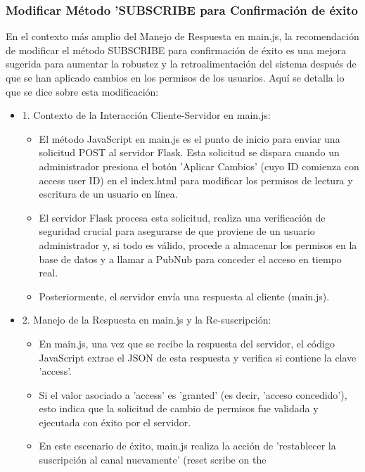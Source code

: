 \documentclass{report}
\begin{document}
\subsubsection{Modificar Método 'SUBSCRIBE para Confirmación de éxito}
En el contexto más amplio del Manejo de Respuesta en main.js, la recomendación de modificar el método SUBSCRIBE para confirmación de éxito es 
una mejora sugerida para aumentar la robustez y la retroalimentación del sistema después de que se han aplicado cambios en los permisos de los usuarios.
Aquí se detalla lo que se dice sobre esta modificación:
\begin{itemize}
    \item 1. Contexto de la Interacción Cliente-Servidor en main.js:
        \begin{itemize}
            \item El método JavaScript en main.js es el punto de inicio para enviar una solicitud POST al servidor Flask. Esta solicitud se 
            dispara cuando un administrador presiona el botón 'Aplicar Cambios' (cuyo ID comienza con access user ID) en el index.html para modificar 
            los permisos de lectura y escritura de un usuario en línea.
            \item El servidor Flask procesa esta solicitud, realiza una verificación de seguridad crucial para asegurarse de que proviene de un usuario 
            administrador y, si todo es válido, procede a almacenar los permisos en la base de datos y a llamar a PubNub para conceder el acceso en 
            tiempo real.
            \item Posteriormente, el servidor envía una respuesta al cliente (main.js).
        \end{itemize}
    \item 2. Manejo de la Respuesta en main.js y la Re-suscripción:
        \begin{itemize}
            \item En main.js, una vez que se recibe la respuesta del servidor, el código JavaScript extrae el JSON de esta respuesta y verifica si 
            contiene la clave 'access'.
            \item Si el valor asociado a 'access' es 'granted' (es decir, 'acceso concedido'), esto indica que la solicitud de cambio de permisos 
            fue validada y ejecutada con éxito por el servidor.
            \item En este escenario de éxito, main.js realiza la acción de 'restablecer la suscripción al canal nuevamente' (reset scribe on the 

\end{itemize}
\end{itemize}
\end{document}
